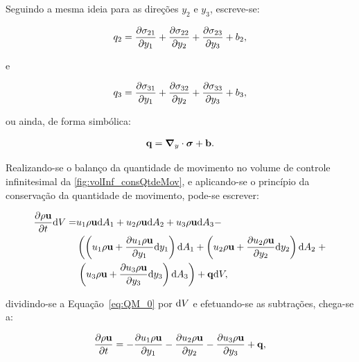Seguindo a mesma ideia para as direções $y_2$ e $y_3$, escreve-se:

\begin{align}
	q_2 =\frac{\partial \sigma_{21}}{\partial y_1} + \frac{\partial \sigma_{22}}{\partial y_2} + \frac{\partial \sigma_{23}}{\partial y_3} + b_{2},
\end{align}	

\noindent e

\begin{align}
	q_3 =\frac{\partial \sigma_{31}}{\partial y_1} + \frac{\partial \sigma_{32}}{\partial y_2} + \frac{\partial \sigma_{33}}{\partial y_3} + b_{3},
\end{align}

\noindent ou ainda, de forma simbólica:

\begin{align}
	\mathbf{q} = \boldsymbol{\nabla}_y \cdot \boldsymbol{\sigma} + \mathbf{b}.
\end{align}

Realizando-se o balanço da quantidade de movimento no volume de controle infinitesimal da \autoref{fig:volInf_consQtdeMov}, e aplicando-se o princípio da conservação da quantidade de movimento, pode-se escrever:

\begin{align}
	\begin{split}
	\frac{\partial \rho \mathbf{u}}{\partial t}\mathrm{d} V =& u_1\rho \mathbf{u} \mathrm{d} A_1 + u_2\rho \mathbf{u} \mathrm{d} A_2 + u_3 \rho \mathbf{u} \mathrm{d} A_3 - \\
	 & \left(\left(u_1 \rho \mathbf{u} + \frac{\partial u_1 \rho \mathbf{u}}{\partial y_1}\mathrm{d} y_1 \right)\mathrm{d} A_1 + \left(u_2 \rho \mathbf{u} + \frac{\partial u_2 \rho \mathbf{u}}{\partial y_2}\mathrm{d} y_2 \right)\mathrm{d} A_2 \right. + \\ & \left.   \left(u_3 \rho \mathbf{u} + \frac{\partial u_3 \rho \mathbf{u}}{\partial y_3}\mathrm{d} y_3 \right)\mathrm{d} A_3\right) + \mathbf{q} \mathrm{d} V,
	\label{eq:QM_0} 
	\end{split}
\end{align}	

\noindent dividindo-se a Equação~\eqref{eq:QM_0} por $\mathrm{d} V$ e efetuando-se as subtrações, chega-se a:

\begin{align}
		\frac{\partial \rho \mathbf{u}}{\partial t} = 
		-\frac{\partial u_1 \rho \mathbf{u}}{\partial y_1} 
		-\frac{\partial u_2 \rho \mathbf{u}}{\partial y_2}  
		-\frac{\partial u_3 \rho \mathbf{u}}{\partial y_3} + \mathbf{q},
		\label{eq:QM_1} 
\end{align}

